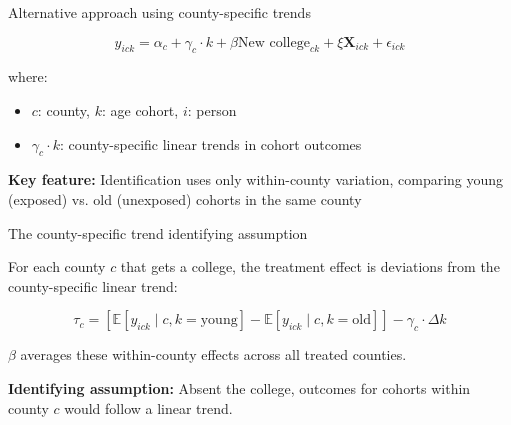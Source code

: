 \documentclass[notes,11pt, aspectratio=169]{beamer}
\begin{document}
\begin{frame}{Alternative approach using county-specific trends}


\begin{equation}
y_{ick} = \alpha_c + \gamma_c \cdot k + \beta \text{New college}_{ck} + \xi \mathbf{X}_{ick} + \epsilon_{ick}
\end{equation}

\vspace{0.5cm}

where:
\begin{itemize}
    \item $c$: county, $k$: age cohort, $i$: person
    \item $\gamma_c \cdot k$: county-specific linear trends in cohort outcomes
\end{itemize}

\vspace{0.3cm}

\textbf{Key feature:} Identification uses only within-county variation, comparing young (exposed) vs. old (unexposed) cohorts in the same county

\end{frame}

\begin{frame}{The county-specific trend identifying assumption}

For each county $c$ that gets a college, the treatment effect is deviations from the county-specific linear trend:

\begin{equation}
  {\tau}_c = \left[\mathbb{E}[y_{ick} \mid c, k = \text{young}] - \mathbb{E}[y_{ick} \mid c, k = \text{old}]\right] - \gamma_c \cdot \Delta k
\end{equation}

$\beta$ averages these within-county effects across all treated counties.

\vspace{0.5cm}

\textbf{Identifying assumption:} Absent the college, outcomes for cohorts within county $c$ would follow a linear trend.
\end{frame}
\end{document}
